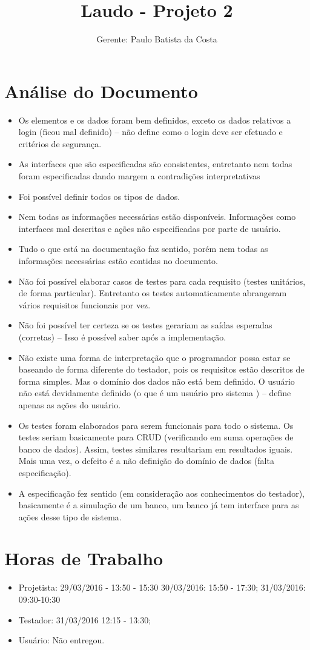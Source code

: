\documentclass[12pt,a4paper,final]{report}
\author{Gerente: Paulo Batista da Costa}
\title{Laudo - Projeto 2}
\begin{document}
\maketitle
\section*{Análise do Documento}
\begin{itemize}
\item Os elementos e os dados foram bem definidos, exceto os dados relativos a login (ficou mal definido) -- não define como o login deve ser efetuado e critérios de segurança.
\item As interfaces que são especificadas são consistentes, entretanto nem todas foram especificadas dando margem a contradições interpretativas
\item Foi possível definir todos os tipos de dados.
\item Nem todas as informações necessárias estão disponíveis. Informações como interfaces mal descritas e ações não especificadas por parte de usuário.
\item Tudo o que está na documentação faz sentido, porém nem todas as informações necessárias estão contidas no documento.


\item Não foi possível elaborar casos de testes para cada requisito (testes unitários, de forma particular). Entretanto os testes automaticamente abrangeram vários requisitos funcionais por vez.

\item Não foi possível ter certeza se os testes gerariam as saídas esperadas (corretas) -- Isso é possível saber após a implementação.

\item Não existe uma forma de interpretação que o programador possa estar se baseando de forma diferente do testador, pois os requisitos estão descritos de forma simples. Mas o domínio dos dados não está bem definido. O usuário não está devidamente definido (o que é um usuário pro sistema ) -- define apenas as ações do usuário. 

\item Os testes foram elaborados para serem funcionais para todo o sistema. Os testes seriam basicamente para CRUD (verificando em suma operações de banco de dados). Assim, testes similares resultariam em resultados iguais. Mais uma vez, o defeito é a não definição do domínio de dados (falta especificação).

\item A especificação fez sentido (em consideração aos conhecimentos do testador), basicamente é a simulação de um banco, um banco já tem interface para as ações desse tipo de sistema. 
\end{itemize}
\newpage
\section*{Horas de Trabalho}
\begin{itemize}
\item Projetista: 29/03/2016 - 13:50 - 15:30
30/03/2016: 15:50 - 17:30;
31/03/2016: 09:30-10:30 
\item Testador: 31/03/2016 12:15 - 13:30;

\item Usuário: Não entregou.
\end{itemize}
\end{document}
